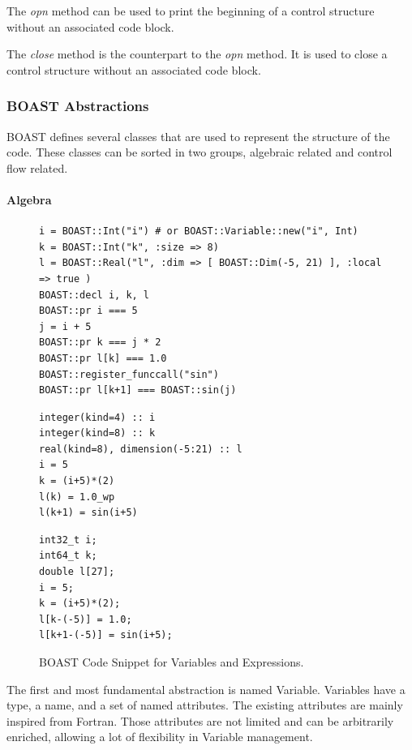 \documentclass{IEEEtran}
\begin{document}
The \emph{opn} method can be used to print the beginning of a control
structure without an associated code block.

The \emph{close} method is the counterpart to the \emph{opn} method. It is used
to close a control structure without an associated code block.

    \subsubsection{BOAST Abstractions}

BOAST defines several classes that are used to represent the structure of the
code. These classes can be sorted in two groups, algebraic related and control
flow related.

      \paragraph{Algebra}

\begin{figure}
\begin{lstlisting}
i = BOAST::Int("i") # or BOAST::Variable::new("i", Int)
k = BOAST::Int("k", :size => 8)
l = BOAST::Real("l", :dim => [ BOAST::Dim(-5, 21) ], :local => true )
BOAST::decl i, k, l
BOAST::pr i === 5
j = i + 5
BOAST::pr k === j * 2
BOAST::pr l[k] === 1.0
BOAST::register_funccall("sin")
BOAST::pr l[k+1] === BOAST::sin(j)
\end{lstlisting}

\begin{minipage}[b]{0.5\linewidth}
\centering
{}

\begin{lstlisting}
integer(kind=4) :: i
integer(kind=8) :: k
real(kind=8), dimension(-5:21) :: l
i = 5
k = (i+5)*(2)
l(k) = 1.0_wp
l(k+1) = sin(i+5)
\end{lstlisting}
\end{minipage}
\hspace{0.08\linewidth}
\begin{minipage}[b]{0.40\linewidth}
\centering
{}

\begin{lstlisting}
int32_t i;
int64_t k;
double l[27];
i = 5;
k = (i+5)*(2);
l[k-(-5)] = 1.0;
l[k+1-(-5)] = sin(i+5);
\end{lstlisting}
\end{minipage}
\caption{BOAST Code Snippet for Variables and Expressions.}
\label{fig:BOAST_algebra}
\end{figure}
The first and most fundamental abstraction is named Variable. Variables have a
type, a name, and a set of named attributes. The existing attributes are mainly
inspired from Fortran. Those attributes are not limited and can be arbitrarily
enriched, allowing a lot of flexibility in Variable management.
\end{document}
